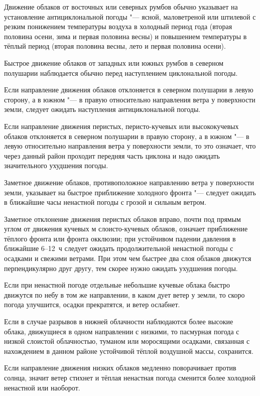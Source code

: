  Движение облаков от восточных или северных румбов обычно
указывает на установление антициклональной погоды "--- ясной,
маловетреной или штилевой с резким понижением температуры воздуха в
холодный период года (вторая половина осени, зима и первая половина
весны) и повышением температуры в тёплый период (вторая половина
весны, лето и первая половина осени).

 Быстрое движение облаков от западных или южных румбов в
северном полушарии наблюдается обычно перед наступлением циклональной
погоды.

 Если направление движения облаков отклоняется в северном
полушарии в левую сторону, а в южном "--- в правую относительно направления
ветра у поверхности земли, следует ожидать наступления
антициклональной погоды.

 Если направление движения перистых, перисто-кучевых или
высококучевых облаков отклоняется в северном полушарии в правую
сторону, а в южном "--- в левую относительно направления ветра у
поверхности земли, то это означает, что через данный район проходит
передняя часть циклона и надо ожидать значительного ухудшения погоды.

 Заметное движение облаков, противоположное направлению ветра у
поверхности земли, указывает на быстрое приближение холодного
фронта "--- следует ожидать в ближайшие часы ненастной погоды с грозой и
сильным ветром.

 Заметное отклонение движения перистых облаков вправо, почти под
прямым углом от движения кучевых м слоисто-кучевых облаков, означает
приближение тёплого фронта или фронта окклюзии; при устойчивом падении
давления в ближайшие 6--12~ч следует ожидать продолжительной ненастной
погоды с осадками и свежими ветрами. При этом чем быстрее два слоя
облаков движутся перпендикулярно друг другу, тем скорее нужно ожидать
ухудшения погоды.

 Если при ненастной погоде отдельные небольшие кучевые облака
быстро движутся по небу в том же направлении, в каком дует ветер у
земли, то скоро погода улучшится, осадки прекратятся, и ветер
ослабнет.

 Если в случае разрывов в нижней облачности наблюдаются более
высокие облака, движущиеся в одном направлении с низкими, то пасмурная
погода с низкой слоистой облачностью, туманом или моросящими осадками,
связанная с нахождением в данном районе устойчивой тёплой воздушной
массы, сохранится.

 Если направление движения низких облаков медленно поворачивает
против солнца, значит ветер стихнет и тёплая ненастная погода сменится
более холодной ненастной или наоборот.

